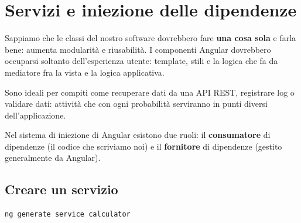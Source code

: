\section{Servizi e iniezione delle dipendenze}

Sappiamo che le classi del nostro software dovrebbero fare \textbf{una cosa
sola} e farla bene: aumenta modularità e riusabilità. I componenti Angular
dovrebbero occuparsi soltanto dell'esperienza utente: template, stili e la
logica che fa da mediatore fra la vista e la logica applicativa.


Sono ideali per compiti come recuperare dati da una API REST, registrare log o
validare dati: attività che con ogni probabilità serviranno in punti diversi
dell'applicazione.


Nel sistema di iniezione di Angular esistono due ruoli: il \textbf{consumatore}
di dipendenze (il codice che scriviamo noi) e il \textbf{fornitore} di
dipendenze (gestito generalmente da Angular).

\subsection{Creare un servizio}

\begin{lstlisting}[style=shell]
ng generate service calculator
\end{lstlisting}

